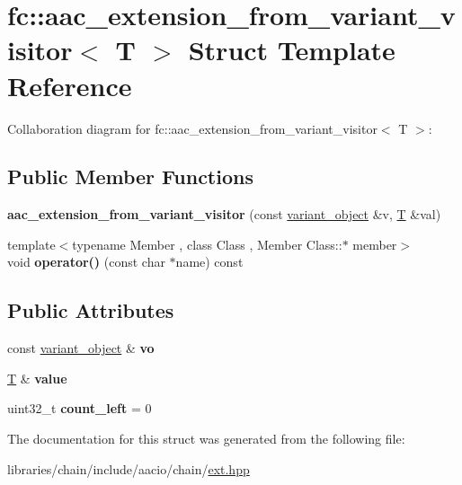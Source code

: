 \hypertarget{structfc_1_1aac__extension__from__variant__visitor}{}\section{fc\+:\+:aac\+\_\+extension\+\_\+from\+\_\+variant\+\_\+visitor$<$ T $>$ Struct Template Reference}
\label{structfc_1_1aac__extension__from__variant__visitor}


Collaboration diagram for fc\+:\+:aac\+\_\+extension\+\_\+from\+\_\+variant\+\_\+visitor$<$ T $>$\+:
\subsection*{Public Member Functions}
\begin{DoxyCompactItemize}
\item 
\mbox{\label{structfc_1_1aac__extension__from__variant__visitor_a4ba4efda9fa3494fd8bdc29dd1d53e47}} 
{\bfseries aac\+\_\+extension\+\_\+from\+\_\+variant\+\_\+visitor} (const \mbox{\hyperlink{classfc_1_1variant__object}{variant\+\_\+object}} \&v, \mbox{\hyperlink{struct_t}{T}} \&val)
\item 
\mbox{\label{structfc_1_1aac__extension__from__variant__visitor_a0b9ccc8a0b97334469fb99b8758574e3}} 
{\footnotesize template$<$typename Member , class Class , Member Class\+::$\ast$ member$>$ }\\void {\bfseries operator()} (const char $\ast$name) const
\end{DoxyCompactItemize}
\subsection*{Public Attributes}
\begin{DoxyCompactItemize}
\item 
\mbox{\label{structfc_1_1aac__extension__from__variant__visitor_affbd402f2988be41cc2e086c070b9c39}} 
const \mbox{\hyperlink{classfc_1_1variant__object}{variant\+\_\+object}} \& {\bfseries vo}
\item 
\mbox{\label{structfc_1_1aac__extension__from__variant__visitor_a8bd7460c016ec800d19d4960337ffbf2}} 
\mbox{\hyperlink{struct_t}{T}} \& {\bfseries value}
\item 
\mbox{\label{structfc_1_1aac__extension__from__variant__visitor_a9f169b82e08c0eddc5e5646ab780c3fd}} 
uint32\+\_\+t {\bfseries count\+\_\+left} = 0
\end{DoxyCompactItemize}


The documentation for this struct was generated from the following file\+:\begin{DoxyCompactItemize}
\item 
libraries/chain/include/aacio/chain/\mbox{\hyperlink{ext_8hpp}{ext.\+hpp}}\end{DoxyCompactItemize}
